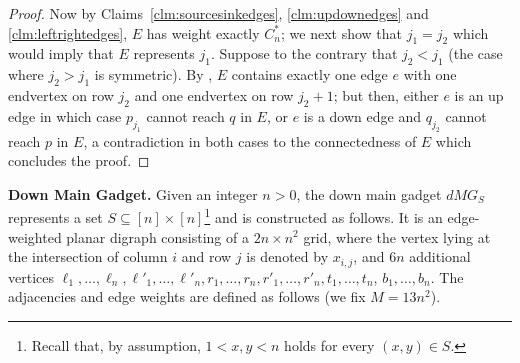 \begin{proof}
Now by Claims~\ref{clm:sourcesinkedges}, \ref{clm:updownedges} and \ref{clm:leftrightedges}, $E$ has weight exactly $C_n^*$; we next show that $j_1 = j_2$ which would imply that $E$ represents $j_1$. Suppose to the contrary that $j_2 < j_1$ (the case where $j_2 > j_1$ is symmetric). By , $E$ contains exactly one edge $e$ with one endvertex on row $j_2$ and one endvertex on row $j_2+1$; but then, either $e$ is an up edge in which case $p_{j_1}$ cannot reach $q$ in $E$, or $e$ is a down edge and $q_{j_2}$ cannot reach $p$ in $E$, a contradiction in both cases to the connectedness of $E$ which concludes the proof. 
\end{proof}


\noindent
\textbf{Down Main Gadget.} Given an integer $n > 0$, the down main gadget $dMG_S$ represents a set $S \subseteq [n] \times [n]$\footnote{Recall that, by assumption, $1 < x,y< n$ holds for every $(x,y) \in S$.} and is constructed as follows. It is an edge-weighted planar digraph consisting of a $2n \times n^2$ grid, where the vertex lying at the intersection of column $i$ and row $j$ is denoted by $x_{i,j}$, and $6n$ additional vertices $\ell_1,\ldots,\ell_n,\ell'_1,\ldots,\ell'_n,r_1,\ldots,r_n,r'_1,\ldots,r'_n,t_1,\ldots,t_n$, $b_1,\ldots,b_n$. The adjacencies and edge weights are defined as follows (we fix $M=13n^2$). 

